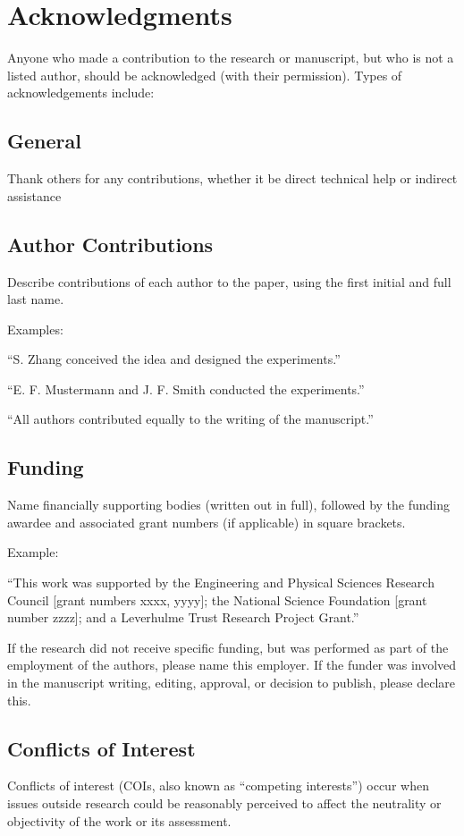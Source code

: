 \documentclass{article}
\begin{document}
\section*{Acknowledgments}
Anyone who made a contribution to the research or manuscript, but who is not a listed author, should be acknowledged (with their permission). Types of acknowledgements include:

\subsection*{General} 
Thank others for any contributions, whether it be direct technical help or indirect assistance 

\subsection*{Author Contributions} 
Describe contributions of each author to the paper, using the first initial and full last name. 

\medskip Examples:

``S. Zhang conceived the idea and designed the experiments.''

``E. F. Mustermann and J. F. Smith conducted the experiments.''

``All authors contributed equally to the writing of the manuscript.''

\subsection*{Funding}
Name financially supporting bodies (written out in full), followed by the funding awardee and associated grant numbers (if applicable) in square brackets. 

\medskip Example: 

``This work was supported by the Engineering and Physical Sciences Research Council [grant numbers xxxx, yyyy]; the National Science Foundation [grant number zzzz]; and a Leverhulme Trust Research Project Grant.'' 

\medskip
If the research did not receive specific funding, but was performed as part of the employment of the authors, please name this employer. If the funder was involved in the manuscript writing, editing, approval, or decision to publish, please declare this.

\subsection*{Conflicts of Interest}
Conflicts of interest (COIs, also known as ``competing interests'') occur when issues outside research could be reasonably perceived to affect the neutrality or objectivity of the work or its assessment. 
\end{document}
